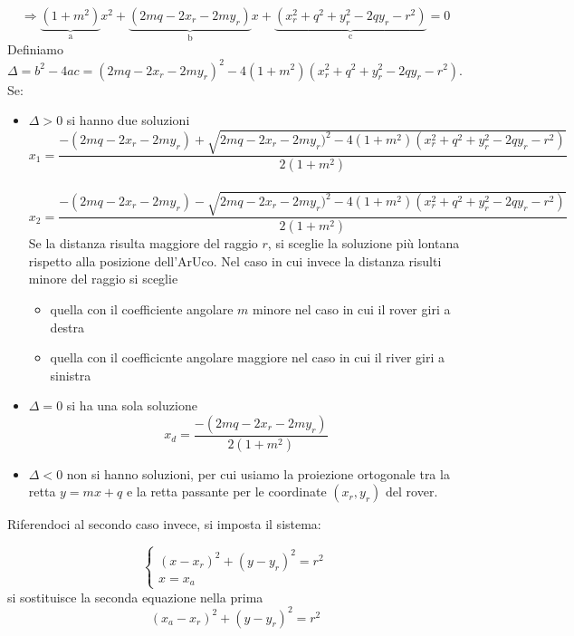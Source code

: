 \begin{equation*}
\Rightarrow \underbrace{(1+m^2)}_\text{a}x^2+\underbrace{(2mq-2x_r-2my_r)}_\text{b}x+\underbrace{(x_r^2+q^2+y_r^2-2qy_r-r^2)}_\text{c}=0
\end{equation*}
Definiamo $\Delta=b^2-4ac=(2mq-2x_r-2my_r)^2-4(1+m^2)(x_r^2+q^2+y_r^2-2qy_r-r^2)$. \\Se:
\begin{itemize}
    \item $\Delta>0$ si hanno due soluzioni
        \begin{equation}
        x_1=\frac{-(2mq-2x_r-2my_r)+\sqrt{2mq-2x_r-2my_r)^2-4(1+m^2)(x_r^2+q^2+y_r^2-2qy_r-r^2)}}{2(1+m^2)}
        \end{equation}
        \\
        \begin{equation}
        x_2=\frac{-(2mq-2x_r-2my_r)-\sqrt{2mq-2x_r-2my_r)^2-4(1+m^2)(x_r^2+q^2+y_r^2-2qy_r-r^2)}}{2(1+m^2)}
        \end{equation}
        Se la distanza risulta maggiore del raggio $r$, si sceglie la soluzione più lontana rispetto alla posizione dell'ArUco.
        Nel caso in cui invece la distanza risulti minore del raggio si sceglie 
        \begin{itemize}
            \item quella con il coefficiente angolare $m$ minore nel caso in cui il rover giri a destra
            \item quella con il coefficicnte angolare maggiore nel caso in cui il river giri a sinistra
        \end{itemize}
    \item $\Delta=0$ si ha una sola soluzione
    \begin{equation}
        x_d=\frac{-(2mq-2x_r-2my_r)}{2(1+m^2)}
        \end{equation}
    \item $\Delta<0$ non si hanno soluzioni, per cui usiamo la proiezione ortogonale tra la retta $y=mx+q$ e la retta passante per le coordinate $(x_r, y_r)$ del rover.
\end{itemize}
Riferendoci al secondo caso invece, si imposta il sistema:

\begin{equation} 
\begin{cases}

    (x-x_r)^2+(y-y_r)^2=r^2
   \\
    x=x_a 
  \end{cases} 
\end{equation}
si sostituisce la seconda equazione nella prima
\begin{equation*}
(x_a-x_r)^2+(y-y_r)^2=r^2
\end{equation*}

